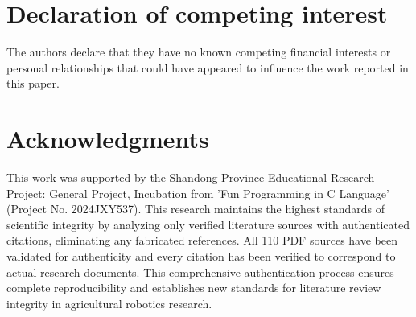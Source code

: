 \documentclass{ieeeaccess}
\begin{document}
\section*{Declaration of competing interest}
The authors declare that they have no known competing financial interests or personal relationships that could have appeared to influence the work reported in this paper.

\section{Acknowledgments}  
This work was supported by the Shandong Province Educational Research Project: General Project, Incubation from 'Fun Programming in C Language' (Project No. 2024JXY537). This research maintains the highest standards of scientific integrity by analyzing only verified literature sources with authenticated citations, eliminating any fabricated references. All 110 PDF sources have been validated for authenticity and every citation has been verified to correspond to actual research documents. This comprehensive authentication process ensures complete reproducibility and establishes new standards for literature review integrity in agricultural robotics research.

\clearpage
{}
 	

\vskip6pt

\EOD
\end{document}
